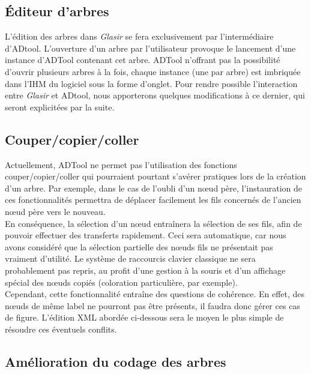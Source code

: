 	\subsection{Éditeur d'arbres} %

	L'édition des arbres dans \emph{Glasir} se fera exclusivement par l'intermédiaire d'ADtool. L'ouverture d'un arbre par l'utilisateur provoque le lancement d'une instance d'ADTool contenant cet arbre. ADTool n'offrant pas la possibilité d'ouvrir plusieurs arbres à la fois, chaque instance (une par arbre) est imbriquée dans l'IHM du logiciel sous la forme d'onglet. Pour rendre possible l'interaction entre \emph{Glasir} et ADtool, nous apporterons quelques modifications à ce dernier, qui seront explicitées par la suite. %

\subsection{Couper/copier/coller}
	
	Actuellement, ADTool ne permet pas l'utilisation des fonctions couper/copier/coller qui pourraient pourtant s'avérer pratiques lors de la création d'un arbre. Par exemple, dans le cas de l'oubli d'un nœud père, l'instauration de ces fonctionnalités permettra de déplacer facilement les fils concernés de l'ancien nœud père vers le nouveau.\\
	En conséquence, la sélection d'un nœud entraînera la sélection de ses fils, afin de pouvoir effectuer des transferts rapidement. Ceci sera automatique, car nous avons considéré que la sélection partielle des nœuds fils ne présentait pas vraiment d'utilité. Le système de raccourcis clavier classique ne sera probablement pas repris, au profit d'une gestion à la souris et d'un affichage spécial des nœuds copiés (coloration particulière, par exemple).\\ %

	Cependant, cette fonctionnalité entraîne des questions de cohérence. En effet, des nœuds de même label ne pourront pas être présents, il faudra donc gérer ces cas de figure. L'édition XML abordée ci-dessous sera le moyen le plus simple de résoudre ces éventuels conflits. %

	\subsection{Amélioration du codage des arbres}

